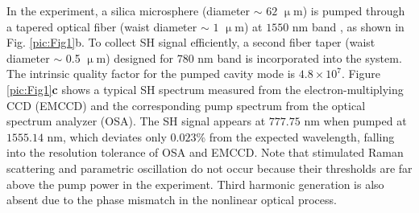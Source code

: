 \documentclass[a4paper,8pt,hyperref, twocolumn]{article}
\begin{document}
In the experiment, a silica microsphere (diameter $\sim$ $62$ $\upmu$m) 
is pumped through a tapered optical fiber (waist diameter $\sim$ $1$ $\upmu$m) at $1550$ nm band \cite{knight1997phase, cai2000observation}, as shown in Fig. \ref{pic:Fig1}b. To collect SH signal efficiently, a second fiber taper (waist diameter $\sim$ 0.5 $\upmu$m) designed for 780 nm band is incorporated into the system. The intrinsic quality factor for the pumped cavity mode is $4.8\times10^7$. %
Figure \ref{pic:Fig1}\textbf{c} shows a typical SH spectrum measured from the electron-multiplying CCD (EMCCD) and the corresponding pump spectrum from the optical spectrum analyzer (OSA). The SH signal appears at $777.75$ nm when pumped at $1555.14$ nm, which deviates only $0.023$\% from the expected wavelength, falling into the resolution tolerance of OSA and EMCCD.
Note that stimulated Raman scattering and parametric oscillation do not occur because their thresholds are far above the pump power in the experiment. %
Third harmonic generation is also absent due to the phase mismatch in the nonlinear optical process.
\end{document}
